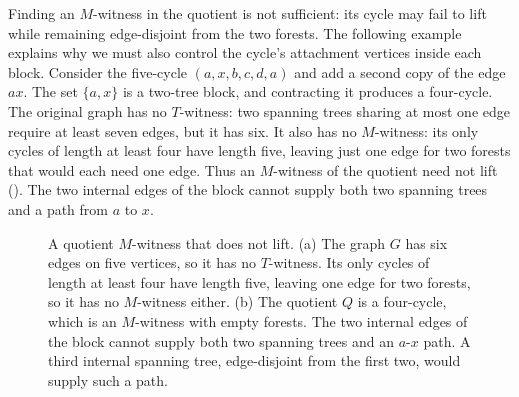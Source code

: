 \documentclass[USenglish, a4paper, thm-restate,numberwithinsect, cleveref]{lipics-v2021}
\begin{document}
Finding an $M$-witness in the quotient is not sufficient: its cycle
may fail to lift while remaining edge-disjoint from the two forests.
The following example explains why we must also control the cycle's
attachment vertices inside each block. Consider the
five-cycle $(a,x,b,c,d,a)$ and add a second copy of the edge $ax$.
The set $\{a,x\}$ is a two-tree block, and contracting it produces a
four-cycle. The original graph has no $T$-witness: two spanning trees
sharing at most one edge require at least seven edges, but it has six.
It also has no $M$-witness: its only cycles of length at least four
have length five, leaving just one edge for two forests that would
each need one edge. Thus an $M$-witness of the quotient need not lift ().
The two internal edges of the block cannot supply both two spanning
trees and a path from $a$ to $x$.

\begin{figure}[t]
\centering
{}
\caption{A quotient $M$-witness that does not lift. (a) The graph $G$ has
six edges on five vertices, so it has no $T$-witness. Its only cycles of
length at least four have length five, leaving one edge for two forests,
so it has no $M$-witness either. (b) The quotient $Q$ is a four-cycle,
which is an $M$-witness with empty forests. The two internal edges of the
block cannot supply both two spanning trees and an $a$-$x$ path. A third internal spanning tree, edge-disjoint from the first two,
would supply such a path.}
\label{fig:nonliftable}
\end{figure}
\end{document}
